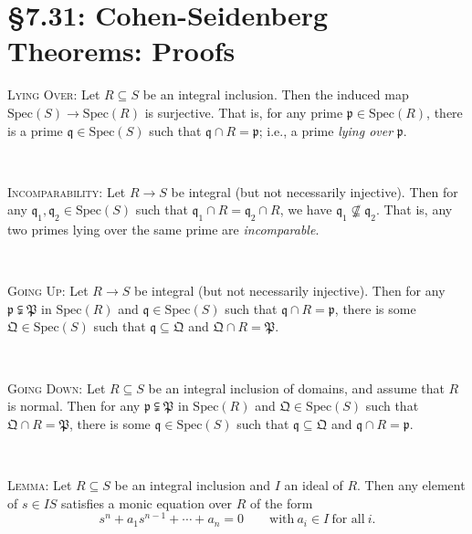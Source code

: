 \documentclass[12pt]{amsart}
\newcommand{\p}{\mathfrak{p}}
\newcommand{\q}{\mathfrak{q}}
\newcommand{\Spec}{\mathrm{Spec}}
\renewcommand{\1}{\mathbbm{1}}
\newcommand{\showsol}[1]{\def\displaysol{#1}}
\begin{document}
\showsol{1}
	
	\thispagestyle{empty}
	
	\section*{\S7.31: Cohen-Seidenberg Theorems: Proofs}
	
	\begin{framed}

\noindent \textsc{Lying Over:} Let $R\subseteq S$ be an integral inclusion. Then the induced map ${\Spec(S)\to \Spec(R)}$ is surjective. That is, for any prime $\p\in \Spec(R)$, there is a prime $\q\in \Spec(S)$ such that $\q \cap R =\p$; i.e., a prime \emph{lying over} $\p$.

\

\noindent \textsc{Incomparability:} Let $R\to S$ be integral (but not necessarily injective). Then for any ${\q_1,\q_2\in \Spec(S)}$ such that $\q_1 \cap R = \q_2 \cap R$, we have $\q_1 \not\nsubseteq \q_2$. That is, any two primes lying over the same prime are \emph{incomparable}.


\

\noindent \textsc{Going Up:} Let $R\to S$ be integral (but not necessarily injective). Then for any $\p \subsetneqq \mathfrak{P}$ in $\Spec(R)$ and $\q\in \Spec(S)$ such that $\q \cap R = \p$, there is some $\mathfrak{Q}\in \Spec(S)$ such that $\q \subseteq \mathfrak{Q}$ and $\mathfrak{Q} \cap R = \mathfrak{P}$. 

\

\noindent \textsc{Going Down:} Let $R\subseteq S$ be an integral inclusion of domains, and assume that $R$ is normal. Then for any $\p \subsetneqq \mathfrak{P}$  in $\Spec(R)$ and $\mathfrak{Q}\in \Spec(S)$ such that $\mathfrak{Q} \cap R = \mathfrak{P}$, there is some $\q\in \Spec(S)$ such that $\q \subseteq \mathfrak{Q}$ and $\q \cap R = \p$. 

\

\noindent \textsc{Lemma:} Let $R\subseteq S$ be an integral inclusion and $I$ an ideal of $R$. Then any element of $s\in IS$ satisfies a monic equation over $R$ of the form\footnotemark
\[ s^n + a_1 s^{n-1} + \cdots + a_n = 0 \qquad \text{with} \ a_i\in I \ \text{for all} \ i.\]
\end{framed}
\end{document}
